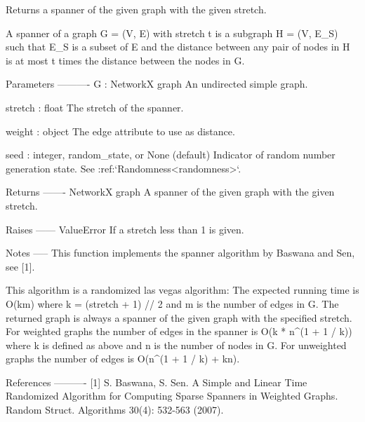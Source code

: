 \begin{DoxyVerb}Returns a spanner of the given graph with the given stretch.

A spanner of a graph G = (V, E) with stretch t is a subgraph
H = (V, E_S) such that E_S is a subset of E and the distance between
any pair of nodes in H is at most t times the distance between the
nodes in G.

Parameters
----------
G : NetworkX graph
    An undirected simple graph.

stretch : float
    The stretch of the spanner.

weight : object
    The edge attribute to use as distance.

seed : integer, random_state, or None (default)
    Indicator of random number generation state.
    See :ref:`Randomness<randomness>`.

Returns
-------
NetworkX graph
    A spanner of the given graph with the given stretch.

Raises
------
ValueError
    If a stretch less than 1 is given.

Notes
-----
This function implements the spanner algorithm by Baswana and Sen,
see [1].

This algorithm is a randomized las vegas algorithm: The expected
running time is O(km) where k = (stretch + 1) // 2 and m is the
number of edges in G. The returned graph is always a spanner of the
given graph with the specified stretch. For weighted graphs the
number of edges in the spanner is O(k * n^(1 + 1 / k)) where k is
defined as above and n is the number of nodes in G. For unweighted
graphs the number of edges is O(n^(1 + 1 / k) + kn).

References
----------
[1] S. Baswana, S. Sen. A Simple and Linear Time Randomized
Algorithm for Computing Sparse Spanners in Weighted Graphs.
Random Struct. Algorithms 30(4): 532-563 (2007).
\end{DoxyVerb}
 